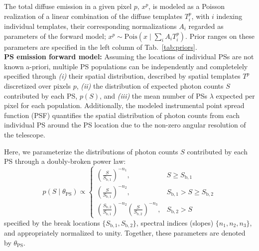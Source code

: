 \documentclass[prd,aps,10pt,nofootinbib,twocolumn,superscriptaddress,preprintnumbers,balancelastpage,longbibliography]{revtex4-1}
\begin{document}
The total diffuse emission in a given pixel $p$, $x^p$, is modeled as a Poisson realization of a linear combination of the diffuse templates $T^p_i$, with $i$ indexing individual templates, their corresponding normalizations $A_i$ regarded as parameters of the forward model; $x^p \sim \mathrm{Pois}\left(x\mid\sum_i A_i T^p_i\right)$. Prior ranges on these parameters are specified in the left column of Tab.~\ref{tab:priors}. \\

\noindent
\textbf{PS emission forward model:} Assuming the locations of individual PSs are not known a-priori, multiple PS populations can be independently and completelely specified through \emph{(i)} their spatial distribution, described by spatial templates $T^p$ discretized over pixels $p$, \emph{(ii)} the distribution of expected photon counts $S$ contributed by each PS, $p(S)$, and \emph{(iii)} the mean number of PSs $\lambda$ expected per pixel for each population.  Additionally, the modeled instrumental point spread function (PSF) quantifies the spatial distribution of photon counts from each individual PS around the PS location due to the non-zero angular resolution of the telescope.

Here, we parameterize the distributions of photon counts $S$ contributed by each PS through a doubly-broken power law:
\begin{equation}
\label{eq:scd_bpl}
p(S\mid\theta_\mathrm{PS})\propto \left\{\begin{array}{lc}
\left(\frac{S}{S_{\mathrm b, 1}}\right)^{-n_{1}}, & S \geq S_{\mathrm b, 1} \\
\left(\frac{S}{S_{\mathrm b, 1}}\right)^{-n_{2}}, & S_{\mathrm b, 1}>S \geq S_{\mathrm b, 2} \\
\left(\frac{S_{\mathrm b, 2}}{S_{\mathrm b, 1}}\right)^{-n_{2}}\left(\frac{S}{S_{\mathrm b, 2}}\right)^{-n_{3}}, & S_{\mathrm b, 2}>S
\end{array}\right.
\end{equation}
specified by the break locations $\{S_{\mathrm b, 1}, S_{\mathrm b, 2}\}$, spectral indices (slopes) $\{n_1, n_2, n_3\}$, and appropriately normalized to unity. Together, these parameters are denoted by $\theta_\mathrm{PS}$.
\end{document}
